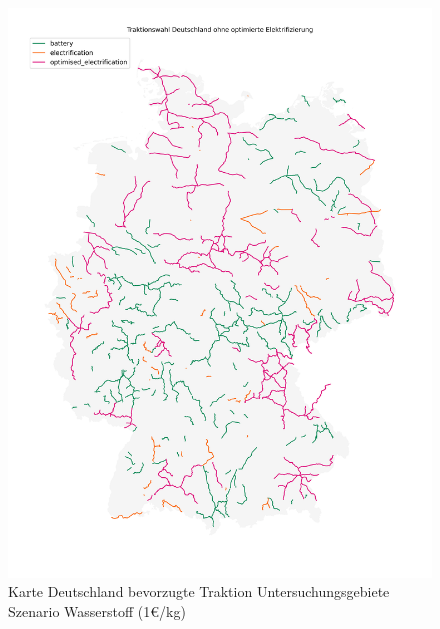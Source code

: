\begin{center}
	\begin{figure}[p]
	\includegraphics[height=0.8\textheight]{../report_scenarios/s_12/files/deutschland_map}
	\caption{\label{fig_s_12_d_map} Karte Deutschland bevorzugte Traktion Untersuchungsgebiete Szenario Wasserstoff (1€/kg)}
	\end{figure}
\end{center}


